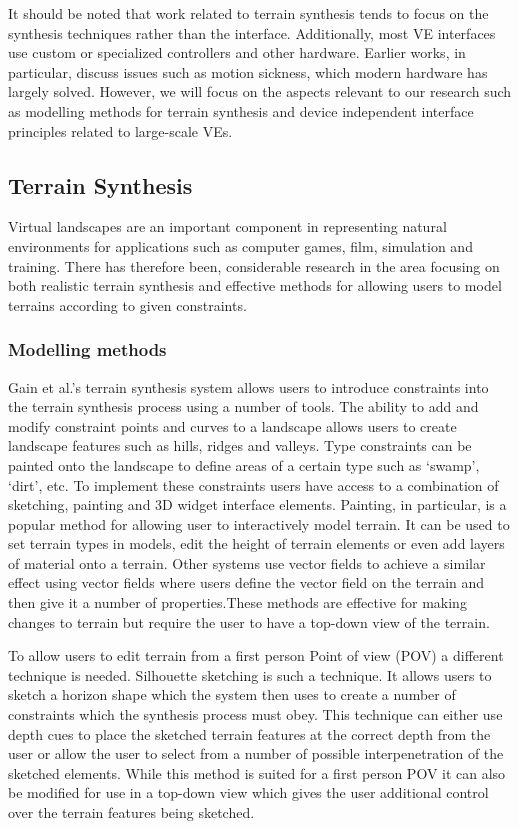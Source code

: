 \documentclass{sig-alternate-05-2015}
\begin{document}
It should be noted that work related to terrain synthesis tends to focus on the synthesis techniques rather than the interface. Additionally, most VE interfaces use custom or specialized controllers and other hardware. Earlier works, in particular, discuss issues such as motion sickness, which modern hardware has largely solved. However,  we will focus on the aspects relevant to our research such as modelling methods for terrain synthesis and device independent interface principles related to large-scale VEs.
\subsection{Terrain Synthesis}
Virtual landscapes are an important component in representing natural environments for applications such as computer games, film, simulation and training\cite{Gain2015}. There has therefore been, considerable research in the area focusing on both realistic terrain synthesis and effective methods for allowing users to model terrains according to given constraints.
\subsubsection{Modelling methods}
Gain et al.'s terrain synthesis system allows users to introduce constraints into the terrain synthesis process using a number of tools\cite{Gain2015}. The ability to add and modify constraint points and curves to a landscape allows users to create landscape features such as hills, ridges and valleys. Type constraints can be painted onto the landscape to define areas of a certain type such as `swamp', `dirt', etc. To implement these constraints users have access to a combination of sketching, painting and 3D widget interface elements. Painting, in particular, is a popular method for allowing  user to interactively model terrain. It can be used to set terrain types in models\cite{Gain2015}, edit the height of terrain elements\cite{Treib2012} or even add layers of material onto a terrain\cite{Vanek2011}. Other systems use vector fields to achieve a similar effect using vector fields where users define the vector field on the terrain and then give it a number of properties\cite{Bruneton2008}.These methods are effective for making changes to terrain but require the user to have a top-down view of the terrain.

To allow users to edit terrain from a first person Point of view (POV) a different technique is needed. Silhouette sketching is such a technique. It allows users to sketch a horizon shape which the system then uses to create a number of constraints which the synthesis process must obey\cite{Tasse2014}. This technique can either use depth cues to place the sketched terrain features at the correct depth from the user\cite{Tasse2014} or allow the user to select from a number of possible interpenetration of the sketched elements\cite{Passos2013}. While this method is suited for a first person POV it can also be modified for use in a top-down view which gives the user additional control over the terrain features being sketched\cite{Gain2009}.
\end{document}

